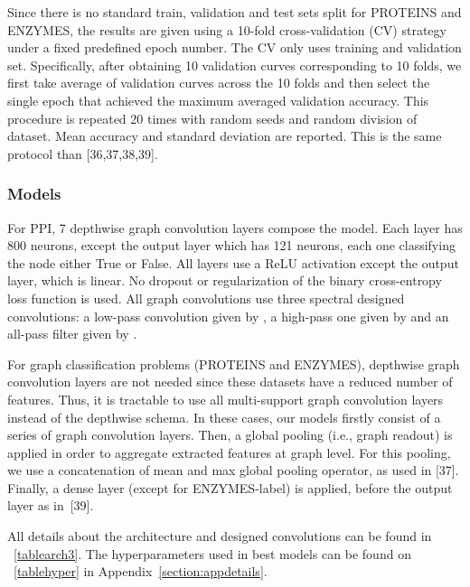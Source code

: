 \documentclass{article}
\begin{document}
Since there is no standard train, validation and test sets split for PROTEINS and ENZYMES, the results are given using a 10-fold cross-validation (CV) strategy under a fixed predefined epoch number. The CV only uses training and validation set. Specifically, after obtaining 10 validation curves corresponding to 10 folds, we first take average of validation curves across the 10 folds and then select the single epoch that achieved the maximum averaged validation accuracy. This procedure is repeated 20 times with random seeds and random division of dataset. Mean accuracy and standard deviation are reported. This is the same protocol than [36,37,38,39].


\subsubsection{Models} 

For PPI, 7 depthwise graph convolution layers compose the model. Each layer has 800 neurons, except the output layer which has 121 neurons, each one classifying the node either True or False. All layers use a ReLU activation except the output layer, which is linear. No dropout or regularization of the binary cross-entropy loss function is used. All graph convolutions use three spectral designed convolutions: a low-pass convolution given by , a high-pass one given by  and an all-pass filter given by .


For graph classification problems (PROTEINS and ENZYMES), depthwise graph convolution layers are not needed since these datasets have a reduced number of features. Thus, it is tractable to use all multi-support graph convolution layers instead of the depthwise schema. In these cases, our models firstly consist of a series of graph convolution layers. Then, a global pooling (i.e., graph readout) is applied in order to aggregate extracted features at graph level. For this pooling, we use a concatenation of mean and max global pooling operator, as used in [37]. Finally, a dense layer (except for ENZYMES-label) is applied, before the output layer as in~[39]. 

All details about the architecture and designed convolutions can be found in \tablename~\ref{tablearch3}. The hyperparameters used in best models can be found on \tablename~\ref{tablehyper} in Appendix~\ref{section:appdetails}. 
\end{document}
